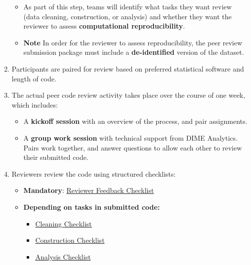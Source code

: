\documentclass{tufte-handout}
\begin{document}
\begin{fullwidth}
\begin{flushleft}
\begin{enumerate}
        \begin{itemize}
            \item As part of this step, teams will identify what tasks they want review (data cleaning, construction, or analysis) and whether they want the reviewer to assess  \textbf{computational reproducibility}. 
            \item \textbf{Note} In order for the reviewer to assess reproducibility, the peer review submission package must include a \textbf{de-identified} version of the dataset.
        \end{itemize}

        \item Participants are paired for review based on preferred statistical software and length of code.

        \item The actual peer code review activity takes place over the course of one week, which includes:
         \begin{itemize}
            \item A \textbf{kickoff session} with an overview of the process, and pair assignments. 
            \item A \textbf{group work session} with technical support from DIME Analytics. Pairs work together, and answer questions to allow each other to review their submitted code.
        \end{itemize}

       \item Reviewers review the code using structured checklists:
        \begin{itemize}
            \item \textbf{Mandatory}: \href{https://github.com/worldbank/dime-standards/blob/master/dime-coding-standards/checklists/Reviewer%20Feedback%20Checklist.pdf}{Reviewer Feedback Checklist}
            \item \textbf{Depending on tasks in submitted code:} 
            \begin{itemize}
                \item \href{https://github.com/worldbank/dime-standards/blob/master/dime-coding-standards/checklists/Cleaning%20Code%20Review%20Checklist.pdf}{Cleaning Checklist}
                \item \href{https://github.com/worldbank/dime-standards/blob/master/dime-coding-standards/checklists/Construction%20Code%20Review%20Checklist.pdf}{Construction Checklist}
                \item \href{https://github.com/worldbank/dime-standards/blob/master/dime-coding-standards/checklists/Analysis%20Code%20Review%20Checklist.pdf}{Analysis Checklist}
            \end{itemize}
        \end{itemize}
        

\end{enumerate}
\end{flushleft}
\end{fullwidth}
\end{document}
